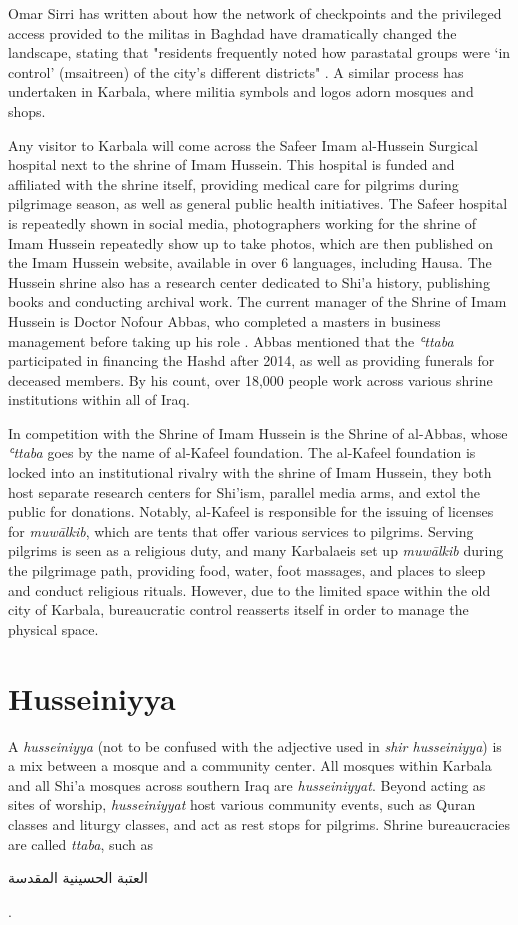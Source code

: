 Omar Sirri has written about how the network of checkpoints and the privileged access provided to the militas in Baghdad have dramatically changed the landscape, stating that "residents frequently noted how parastatal groups were ‘in control’ (msaitreen) of the city’s different districts" \cite[14]{omar_sirri_destructive_2021}. A similar process has undertaken in Karbala, where militia symbols and logos adorn mosques and shops. 

Any visitor to Karbala will come across the Safeer Imam al-Hussein Surgical hospital next to the shrine of Imam Hussein. This hospital is funded and affiliated with the shrine itself, providing medical care for pilgrims during pilgrimage season, as well as general public health initiatives. The Safeer hospital is repeatedly shown in social media, photographers working for the shrine of Imam Hussein repeatedly show up to take photos, which are then published on the Imam Hussein website, available in over 6 languages, including Hausa. The Hussein shrine also has a research center dedicated to Shi'a history, publishing books and conducting archival work. The current manager of the Shrine of Imam Hussein is Doctor Nofour Abbas, who completed a masters in business management before taking up his role \cite{nofour_abbas_interview_2021}. Abbas mentioned that the \emph{ʿttaba} participated in financing the Hashd after 2014, as well as providing funerals for deceased members. By his count, over 18,000 people work across various shrine institutions within all of Iraq. 

In competition with the Shrine of Imam Hussein is the Shrine of al-Abbas, whose \emph{ʿttaba} goes by the name of al-Kafeel foundation. The al-Kafeel foundation is locked into an institutional rivalry with the shrine of Imam Hussein, they both host separate research centers for Shi'ism, parallel media arms, and extol the public for donations. Notably, al-Kafeel is responsible for the issuing of licenses for \emph{muwālkib}, which are tents that offer various services to pilgrims. Serving pilgrims is seen as a religious duty, and many Karbalaeis set up \emph{muwālkib} during the pilgrimage path, providing food, water, foot massages, and places to sleep and conduct religious rituals. However, due to the limited space within the old city of Karbala, bureaucratic control reasserts itself in order to manage the physical space. 

\section{Husseiniyya}
A \emph{husseiniyya} (not to be confused with the adjective used in \emph{sh{\araayn}ir \emph{husseiniyya}}) is a mix between a mosque and a community center. All mosques within Karbala and all Shi'a mosques across southern Iraq are \emph{husseiniyyat}. Beyond acting as sites of worship, \emph{husseiniyyat} host various community events, such as Qur{\arahamza}an classes and liturgy classes, and act as rest stops for pilgrims. Shrine bureaucracies are called \emph{{\araayn}ttaba}, such as 
\begin{Arabic}
العتبة الحسينية المقدسة
\end{Arabic}.

